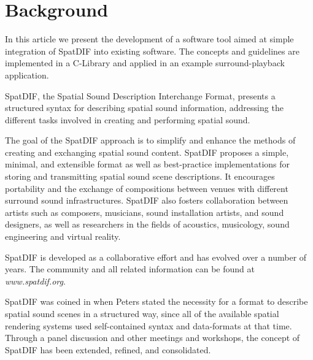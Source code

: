 \documentclass{article}
\title{\papertitle}
\begin{document}
%
\capstartfalse
\maketitle
\capstarttrue
%
\begin{abstract}
The development and specification of SpatDIF, the spatial sound descriptor interchange format, is complemented with an actual software implementation in order to become usable in various environments. 
In this article, the current state in the development of a software library called `SpatDIFlib' is discussed.
The design principles derived from the concepts and specifications of SpatDIF, the class structure of the library, and code demonstrating its usage is presented.
Furthermore, an application that utilises the library is introduced as an exemplary use case.
\end{abstract}
%
\section{Background}

In this article we present the development of a software tool aimed at simple integration of SpatDIF into existing software.
The concepts and guidelines are implemented in a C-Library and applied in an example surround-playback application.

SpatDIF, the Spatial Sound Description Interchange Format, presents a structured syntax for describing spatial sound information, addressing the different tasks involved in creating and performing spatial sound.

The goal of the SpatDIF approach is to simplify and enhance the methods of creating and exchanging spatial sound content. 
SpatDIF proposes a simple, minimal, and extensible format as well as best-practice implementations for storing and transmitting spatial sound scene descriptions. 
It encourages portability and the exchange of compositions between venues with different surround sound infrastructures. 
SpatDIF also fosters collaboration between artists such as composers, musicians, sound installation artists, and sound designers, as well as researchers in the fields of acoustics, musicology, sound engineering and virtual reality.

SpatDIF is developed as a collaborative effort and has evolved over a number of years. 
The community and all related information can be found at {\it www.spatdif.org}.

SpatDIF was coined in \citeyear{peters_caa07} \cite{peters_caa07} when Peters stated the necessity for a format to describe spatial sound scenes in a structured way, since all of the available spatial rendering systems used self-contained syntax and data-formats at that time. 
Through a panel discussion \cite{2008ICMCpanel, Peters:2008spatdif} and other meetings and workshops, the concept of SpatDIF has been extended, refined, and consolidated.
\end{document}
